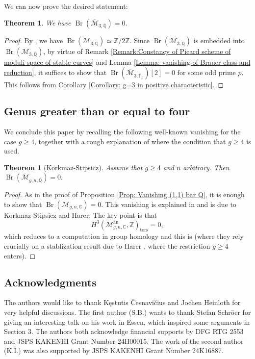 \documentclass{amsart}
\newtheorem{thm}[prop]{Theorem}
\theoremstyle{definition}
\theoremstyle{remark}
\DeclareMathOperator{\Br}{Br}
\DeclareMathOperator{\tors}{tors}
\newcommand{\Qbar}{\overline{\mathbb{Q}}}
\newcommand{\ZZ}{\mathbb Z}
\newcommand{\QQ}{\mathbb Q}
\newcommand{\Fbar}{\overline{\mathbb F}_p}
\begin{document}
We can now prove the desired statement:

\begin{thm}\label{Theorem: g=3 in characteristic 0}
    We have $\Br(\overline{\mathcal{M}}_{3, \overline{\QQ}})=0$.
\end{thm}

\begin{proof}
    By \cite{Lorenzo-Pirisi},
    we have $\Br(\mathcal{M}_{3, \overline{\QQ}}) \simeq \ZZ/2\ZZ$.
    Since $\Br(\overline{\mathcal{M}}_{3, \overline{\QQ}})$ is embedded into $\Br(\mathcal{M}_{3, \overline{\QQ}})$,
    by virtue of Remark \ref{Remark:Constancy of Picard scheme of moduli space of stable curves} and Lemma \ref{Lemma: vanishing of Brauer class and reduction}, it suffices to show that $\Br(\overline{\mathcal{M}}_{3, \Fbar})[2]=0$
    for some odd prime $p$.
    This follows from Corollary \ref{Corollary: g=3 in positive characteristic}.
\end{proof}
\subsection{Genus greater than or equal to four}

We conclude this paper by recalling the following well-known vanishing for the case $g \geq 4$, together with a rough explanation of where the condition that $g \geq 4$ is used.

\begin{thm}[Korkmaz-Stipsicz]\label{thm vanishing over C}
Assume that $g\geq 4$ and $n$ arbitrary.
Then
$
\Br(\overline{\mathcal{M}}_{g,n,\Qbar})=0.
$
\end{thm}
\begin{proof}
As in the proof of Proposition \ref{Prop: Vanishing (1,1) bar Q}, it is enough to show that $\Br(\mathcal{M}_{g,n,\mathbb{C}})=0.$
This vanishing is explained in \cite[Theorem 4.1]{Fringuelli-Pirisi} and is due to Korkmaz-Stipsicz and Harer:
The key point is that 
$$
H^{3}(\mathcal{M}_{g,n,\mathbb{C}}^{\text{an}},\ZZ)_{\tors}=0,
$$
which reduces to a computation in group homology and this is \cite[Theorem 1.1]{SecondHomologyGenusGEQ4} (where they rely crucially on a stablization result due to Harer \cite{HarerStability}, where the restriction $g\geq 4$ enters).
\end{proof}

\subsection*{Acknowledgments}
The authors would like to thank K\k{e}stutis \v{C}esnavi\v{c}ius and Jochen Heinloth for very helpful discussions.
The first author (S.B.) wants to thank Stefan Schröer for giving an interesting talk on his work \cite{SchroerEnriquesZ} in Essen, which inspired some arguments in Section 3.
The authors both acknowledge financial supports by DFG RTG 2553 and JSPS KAKENHI Grant Number 24H00015.
The work of the second author (K.I.) was also supported by JSPS KAKENHI Grant Number 24K16887.



\end{document}

